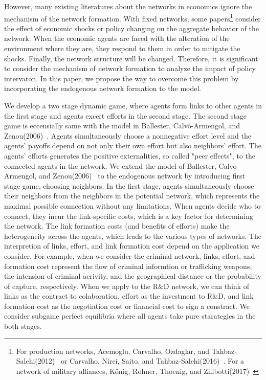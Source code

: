 \documentclass[12pt]{article}
\theoremstyle{definition}
\begin{document}
However, many existing literatures about the networks in economics ignore the mechanism of the network formation.
With fixed networks, some papers\footnote{For production networks, Acemoglu, Carvalho, Ozdaglar, and Tahbaz‐Salehi(2012)~\cite{origin} or Carvalho, Nirei, Saito, and Tahbaz-Salehi(2016)~\cite{nirei}. For a network of military alliances, K\"{o}nig, Rohner, Thoenig, and Zilibotti(2017)~\cite{conflict}} consider the effect of economic shocks or policy changing on the aggregate behavior of the network.
When the economic agents are faced with the alteration of the environment where they are, they respond to them in order to mitigate the shocks.
Finally, the network structure will be changed.
Therefore, it is significant to consider the mechanism of network formation to analyze the impact of policy intervaton.
In this paper, we propose the way to overcome this problem by incorporating the endogenous network formation to the model.

We develop a two stage dynamic game, where agents form links to other agents in the first stage and agents excert efforts in the second stage.
The second stage game is eccensially same with the model in Ballester, Calv\'{o}-Armengol, and Zenou(2006)~\cite{whowho}.
Agents simultaneously choose a nonnegative effort level and the agents' payoffs depend on not only their own effort but also neighbors' effort.
The agents' efforts generates the positive externalities, so called "peer effects", to the connected agents in the network.
We extend the model of Ballester, Calvo-Armengol, and Zenou(2006)~\cite{whowho} to the endogenous network by introducing first stage game, choosing neighbors.
In the first stage, agents simultaneously choose their neighbors from the neighbors in the potential network, which represents the maximal possible conncetion without any limitations.
When agents decide who to connect, they incur the link-specific costs, which is a key factor for determining the network.
The link formation costs (and benefits of efforts) make the heterogeneity across the agents, which leads to the various types of networks.
The interpretion of links, effort, and link formation cost depend on the application we consider.
For example, when we consider the criminal network, links, effort, and formation cost represent the flow of criminal informtion or trafficking weapons, the intension of criminal acrivity, and the geographical distance or the probability of capture, respectively.
When we apply to the R\&D network, we can think of links as the contract to colaboration, effort as the investment to R\&D, and link formation cost as the negotiation cost or financial cost to sign a constract.
We consider subgame perfect equilibria where all agents take pure starategies in the both stages.
\end{document}
